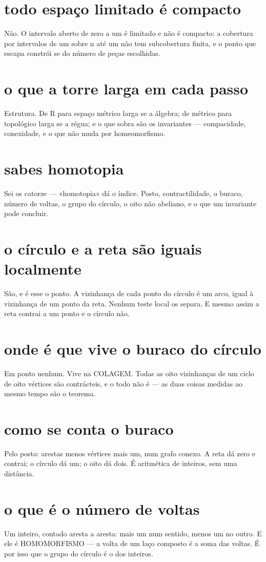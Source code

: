 \documentclass[11pt,a4paper]{article}
\begin{document}
\section{todo espaço limitado é compacto}
Não. O intervalo aberto de zero a um é limitado e não é compacto: a cobertura por
intervalos de um sobre n até um não tem subcobertura finita, e o ponto que escapa
constrói se do número de peças escolhidas.

\section{o que a torre larga em cada passo}
Estrutura. De R para espaço métrico larga se a álgebra; de métrico para topológico larga
se a régua; e o que sobra são os invariantes — compacidade, conexidade, e o que não muda
por homeomorfismo.

\section{sabes homotopia}
Sei os catorze — «homotopia» dá o índice. Posto, contractilidade, o buraco, número de
voltas, o grupo do círculo, o oito não abeliano, e o que um invariante pode concluir.

\section{o círculo e a reta são iguais localmente}
São, e é esse o ponto. A vizinhança de cada ponto do círculo é um arco, igual à
vizinhança de um ponto da reta. Nenhum teste local os separa. E mesmo assim a reta
contrai a um ponto e o círculo não.

\section{onde é que vive o buraco do círculo}
Em ponto nenhum. Vive na COLAGEM. Todas as oito vizinhanças de um ciclo de oito vértices
são contrácteis, e o todo não é — as duas coisas medidas ao mesmo tempo são o teorema.

\section{como se conta o buraco}
Pelo posto: arestas menos vértices mais um, num grafo conexo. A reta dá zero e contrai; o
círculo dá um; o oito dá dois. É aritmética de inteiros, sem uma distância.

\section{o que é o número de voltas}
Um inteiro, contado aresta a aresta: mais um num sentido, menos um no outro. E ele é
HOMOMORFISMO — a volta de um laço composto é a soma das voltas. É por isso que o grupo do
círculo é o dos inteiros.
\end{document}
